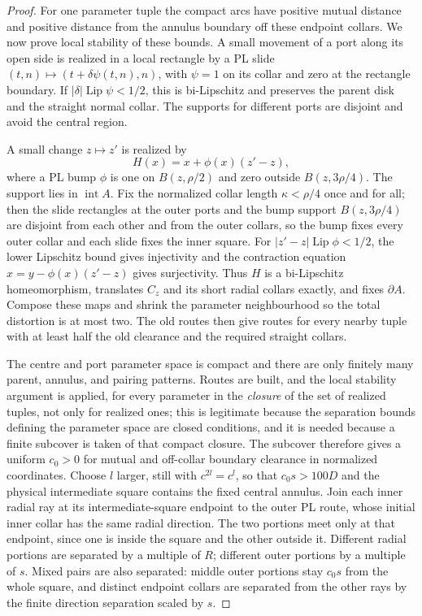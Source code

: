 \begin{proof}
For one parameter tuple the compact arcs have positive mutual distance
and positive distance from the annulus boundary off these endpoint
collars.  We now prove local stability of these bounds.  A small movement
of a port along its open side is realized in a local rectangle by a PL
slide $(t,n)\mapsto(t+\delta\psi(t,n),n)$, with $\psi=1$ on its
collar and zero at the rectangle boundary.  If
$|\delta|\operatorname{Lip}\psi<1/2$, this is bi-Lipschitz and
preserves the parent disk and the straight normal collar.  The supports
for different ports are disjoint and avoid the central region.

A small change $z\mapsto z'$ is realized by
\[
 H(x)=x+\phi(x)(z'-z),
\]
where a PL bump $\phi$ is one on $B(z,\rho/2)$ and zero outside
$B(z,3\rho/4)$.  The support lies in $\operatorname{int}A$.  Fix the
normalized collar length $\kappa<\rho/4$ once and for all; then the slide
rectangles at the outer ports and the bump support $B(z,3\rho/4)$ are
disjoint from each other and from the outer collars, so the bump fixes
every outer collar and each slide fixes the inner square.
For $|z'-z|\operatorname{Lip}\phi<1/2$, the lower Lipschitz bound
gives injectivity and the contraction equation
$x=y-\phi(x)(z'-z)$ gives surjectivity.  Thus $H$ is a bi-Lipschitz
homeomorphism, translates $C_z$ and its short radial collars exactly,
and fixes $\partial A$.  Compose these maps and shrink the parameter
neighbourhood so the total distortion is at most two.  The old routes
then give routes for every nearby tuple with at least half the old
clearance and the required straight collars.

The centre and port parameter space is compact and there are only
finitely many parent, annulus, and pairing patterns.  Routes are built,
and the local stability argument is applied, for every parameter in the
\emph{closure} of the set of realized tuples, not only for realized ones;
this is legitimate because the separation bounds defining the parameter
space are closed conditions, and it is needed because a finite subcover
is taken of that compact closure.  The subcover therefore gives a uniform
$c_0>0$ for mutual and off-collar boundary clearance in normalized
coordinates.  Choose $l$ larger, still with
$c^{2l}=c^l$, so that $c_0s>100D$ and the physical intermediate square
contains the fixed central annulus.  Join each inner radial ray at its
intermediate-square endpoint to the outer PL route, whose initial
inner collar has the same radial direction.  The two portions meet
only at that endpoint, since one is inside the square and the other
outside it.  Different radial portions are separated by a multiple of
$R$; different outer portions by a multiple of $s$.  Mixed pairs are
also separated: middle outer portions stay $c_0s$ from the whole square,
and distinct endpoint collars are separated from the other rays by the
finite direction separation scaled by $s$.


\end{proof}
